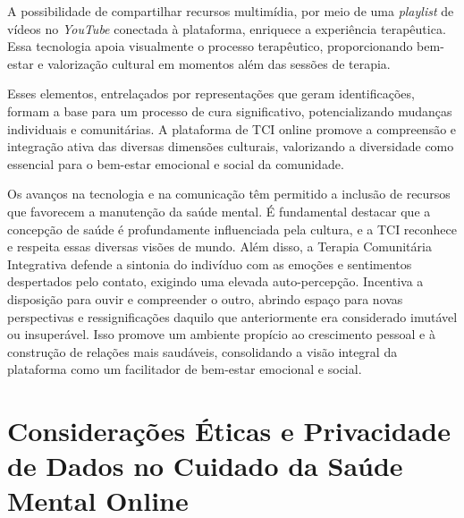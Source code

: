         A possibilidade de compartilhar recursos multimídia, por meio de uma \textit{playlist} de vídeos no \textit{YouTube} conectada à plataforma, enriquece a experiência terapêutica. Essa tecnologia apoia visualmente o processo terapêutico, proporcionando bem-estar e valorização cultural em momentos além das sessões de terapia.
        
        Esses elementos, entrelaçados por representações que geram identificações, formam a base para um processo de cura significativo, potencializando mudanças individuais e comunitárias. A plataforma de TCI online promove a compreensão e integração ativa das diversas dimensões culturais, valorizando a diversidade como essencial para o bem-estar emocional e social da comunidade.
        
        Os avanços na tecnologia e na comunicação têm permitido a inclusão de recursos que favorecem a manutenção da saúde mental. É fundamental destacar que a concepção de saúde é profundamente influenciada pela cultura, e a TCI reconhece e respeita essas diversas visões de mundo. Além disso, a Terapia Comunitária Integrativa defende a sintonia do indivíduo com as emoções e sentimentos despertados pelo contato, exigindo uma elevada auto-percepção. Incentiva a disposição para ouvir e compreender o outro, abrindo espaço para novas perspectivas e ressignificações daquilo que anteriormente era considerado imutável ou insuperável. Isso promove um ambiente propício ao crescimento pessoal e à construção de relações mais saudáveis, consolidando a visão integral da plataforma como um facilitador de bem-estar emocional e social.
    
    
    \chapter{Considerações Éticas e Privacidade de Dados no Cuidado da Saúde Mental Online}
    
